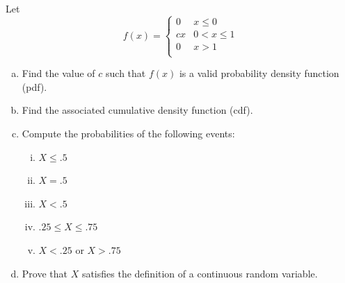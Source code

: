 \begin{frame}
  \begin{block}{\example}
    Let
    \[
      f(x)=
      \left\{
        \begin{array}{ll}
          0 & x \leq 0\\
          cx & 0 < x \leq 1\\
          0 & x > 1\\
        \end{array}
      \right.
    \]

    \begin{scriptsize}
      \begin{enumerate}[a)]
      \item Find the value of $c$ such that $f(x)$ is a valid probability density function (pdf).

      \item Find the associated cumulative density function (cdf).
        
      \item Compute the probabilities of the following events:
        \begin{enumerate}[i)]
        \item $X \leq .5$
        \item $X = .5$
        \item $X < .5$
        \item $.25 \leq X \leq .75$
        \item $X <.25$ or $X>.75$
        \end{enumerate}

      \item Prove that $X$ satisfies the definition of a continuous random variable.
      \end{enumerate}
    \end{scriptsize}
  \end{block}
\end{frame}



